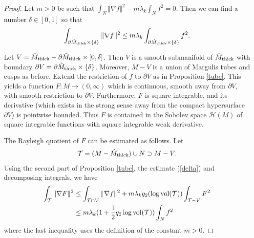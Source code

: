 \documentclass[11pt]{amsart}
\theoremstyle{plain}
\theoremstyle{plain}
\theoremstyle{definition}
\newcommand{\cal}{\mathcal}
\begin{document}
\begin{proof}
Let $m>0$ be such that 
$\int_N\Vert \nabla f\Vert^2-
m\lambda_k \int_Nf^2=0$. Then we can find a number
$\delta\in [0,1]$ so that
\begin{equation}\label{delta}
\int_{\partial \hat M_{\rm thick}\times \{\delta\}}
\Vert \nabla f\Vert^2
\leq m\lambda_k\int_{\partial \hat M_{\rm thick}\times \{\delta\}}f^2.
\end{equation}

Let $V=\hat M_{\rm thick}-\partial \hat M_{\rm thick}\times [0,\delta]$.
Then $V$ is a smooth submanifold of $\hat M_{\rm thick}$ with 
boundary $\partial V=
\partial \hat M_{\rm thick}\times \{\delta\}$.
Moreover, $M-V$ is a union of Margulis tubes and cusps as before.
Extend the restriction of $f$ to $\partial V$ as in 
Proposition \ref{tube}. This yields a function 
$F:M\to (0,\infty)$ which is continuous, smooth away from 
$\partial V$, with smooth restriction to $\partial V$.
Furthermore, $F$ is square integrable, and its 
derivative (which exists in the strong sense away from the
compact hypersurface $\partial V$) is pointwise bounded. 
Thus $F$ is contained in the Sobolev space ${\cal H}(M)$ of 
square integrable functions with square integrable 
weak derivative. 


The Rayleigh quotient of $F$ can be estimated as follows. 
Let \[{\cal T}=(M-\hat M_{\rm thick})\cup N\supset M-V.\] 
Using the second part of Proposition \ref{tube}, the estimate
(\ref{delta}) and decomposing
integrals, we have 
\begin{align}\label{formula1}
\int_{\cal T}\Vert \nabla F\Vert^2&\leq \int_{{\cal T}\cap V}\Vert \nabla f\Vert^2 +
 m\lambda_k q_2(\log {\rm vol}({\cal T}))\int_{{\cal T}-V}F^2\notag \\ 
   &\leq  m\lambda_k (1+\frac{1}{2}q_2
       \log {\rm vol}({\cal T}))
             \int_N f^2\end{align}
where the last inequality uses the definition of the constant $m>0$. 


\end{proof}
\end{document}

